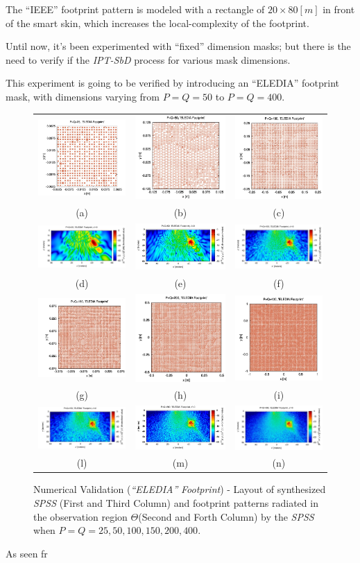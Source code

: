 The {}``IEEE'' footprint pattern is modeled with a rectangle of
$20\times80[m]$ in front of the smart skin, which increases the local-complexity
of the footprint. 

Until now, it's been experimented with {}``fixed'' dimension masks;
but there is the need to verify if the \emph{IPT-SbD} process for
various mask dimensions. 

This experiment is going to be verified by introducing an {}``ELEDIA''
footprint mask, with dimensions varying from $P=Q=50$ to $P=Q=400$.

%
\begin{figure}[H]
\begin{center}\begin{longtable}{ccc}
\includegraphics[scale=0.15]{./Figure/Figure20.jpg}&\includegraphics[scale=0.15]{./Figure/Figure21.jpg}&\includegraphics[scale=0.15]{./Figure/Figure22.jpg}\tabularnewline
(a)&(b)&(c)\tabularnewline
\newpage
\includegraphics[scale=0.15]{./Figure/Figure26.jpg}&\includegraphics[scale=0.15]{./Figure/Figure27.jpg}&\includegraphics[scale=0.15]{./Figure/Figure28.jpg}\tabularnewline
(d)&(e)&(f)\tabularnewline
\includegraphics[scale=0.15]{./Figure/Figure23.jpg}&
\includegraphics[scale=0.15]{./Figure/Figure24.jpg}&
\includegraphics[scale=0.15]{./Figure/Figure25.jpg}\tabularnewline
(g)&(h)&(i)\tabularnewline
\includegraphics[scale=0.15]{./Figure/Figure29.jpg}&
\includegraphics[scale=0.15]{./Figure/Figure30.jpg}&
\includegraphics[scale=0.15]{./Figure/Figure31.jpg}\tabularnewline
(l)&(m)&(n)\tabularnewline
\end{longtable}\end{center}


\caption{\footnotesize\label{cap:ELEDIA_Footprint1} Numerical Validation (\emph{{}``ELEDIA''}
\emph{Footprint}) - Layout of synthesized \emph{SPSS} (First and Third
Column) and footprint patterns radiated in the observation region
$\Theta$(Second and Forth Column) by the \emph{SPSS} when $P=Q=25,50,100,150,200,400$.}
\end{figure}
As seen fr